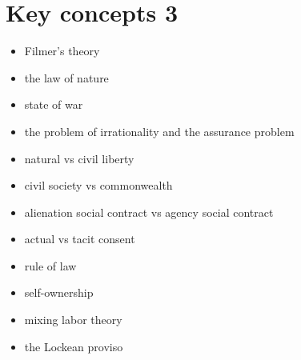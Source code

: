 \section{Key concepts 3}

\begin{itemize}
	\item Filmer’s theory
	\item the law of nature
	\item state of war
	\item the problem of irrationality and the assurance problem
	\item natural vs civil liberty
	\item civil society vs commonwealth
	\item alienation social contract vs agency social contract
	\item actual vs tacit consent
	\item rule of law
	\item self-ownership
	\item mixing labor theory
	\item the Lockean proviso
\end{itemize}
